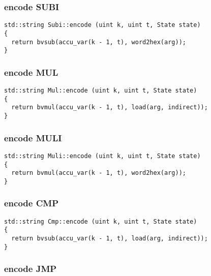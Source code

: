 \subsubsection{encode SUBI}

\begin{lstlisting}[style=c++]
std::string Subi::encode (uint k, uint t, State state)
{
  return bvsub(accu_var(k - 1, t), word2hex(arg));
}
\end{lstlisting}

\subsubsection{encode MUL}

\begin{lstlisting}[style=c++]
std::string Mul::encode (uint k, uint t, State state)
{
  return bvmul(accu_var(k - 1, t), load(arg, indirect));
}
\end{lstlisting}

\subsubsection{encode MULI}

\begin{lstlisting}[style=c++]
std::string Muli::encode (uint k, uint t, State state)
{
  return bvmul(accu_var(k - 1, t), word2hex(arg));
}
\end{lstlisting}

\subsubsection{encode CMP}

\begin{lstlisting}[style=c++]
std::string Cmp::encode (uint k, uint t, State state)
{
  return bvsub(accu_var(k - 1, t), load(arg, indirect));
}
\end{lstlisting}

\subsubsection{encode JMP}

